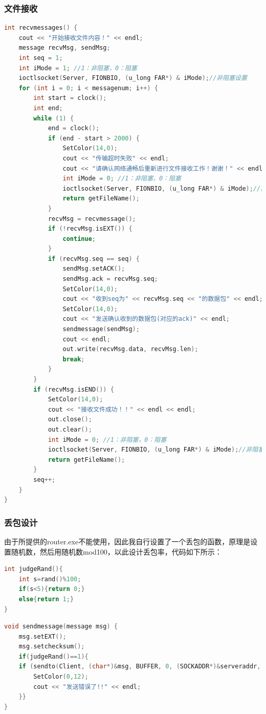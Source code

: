 \documentclass[UTF8,a4paper,10pt]{ctexart}
\begin{document}
\subsubsection{文件接收}
\begin{lstlisting}[title=服务器接收文件,frame=trbl,language={C++}]
int recvmessages() {
    cout << "开始接收文件内容！" << endl;
    message recvMsg, sendMsg;
    int seq = 1;
    int iMode = 1; //1：非阻塞，0：阻塞
    ioctlsocket(Server, FIONBIO, (u_long FAR*) & iMode);//非阻塞设置
    for (int i = 0; i < messagenum; i++) {
        int start = clock();
        int end;
        while (1) {
            end = clock();
            if (end - start > 2000) {
                SetColor(14,0);
                cout << "传输超时失败" << endl;
                cout << "请确认网络通畅后重新进行文件接收工作！谢谢！" << endl;
                int iMode = 0; //1：非阻塞，0：阻塞
                ioctlsocket(Server, FIONBIO, (u_long FAR*) & iMode);//非阻塞设置
                return getFileName();
            }
            recvMsg = recvmessage();
            if (!recvMsg.isEXT()) {
                continue;
            }
            if (recvMsg.seq == seq) {
                sendMsg.setACK();
                sendMsg.ack = recvMsg.seq;
                SetColor(14,0);
                cout << "收到seq为" << recvMsg.seq << "的数据包" << endl;
                SetColor(14,0);
                cout << "发送确认收到的数据包(对应的ack)" << endl;
                sendmessage(sendMsg);
                cout << endl;
                out.write(recvMsg.data, recvMsg.len);
                break;
            }
        }
        if (recvMsg.isEND()) {
            SetColor(14,0);
            cout << "接收文件成功！！" << endl << endl;
            out.close();
            out.clear();
            int iMode = 0; //1：非阻塞，0：阻塞
            ioctlsocket(Server, FIONBIO, (u_long FAR*) & iMode);//非阻塞设置
            return getFileName();
        }
        seq++;
    }
}
\end{lstlisting}
\subsubsection{丢包设计}
由于所提供的router.exe不能使用，因此我自行设置了一个丢包的函数，原理是设置随机数，然后用随机数mod100，以此设计丢包率，代码如下所示：
\begin{lstlisting}[title=丢包函数,frame=trbl,language={C++}]
int judgeRand(){
    int s=rand()%100;
    if(s<5){return 0;}
    else{return 1;}
}
\end{lstlisting}
\begin{lstlisting}[title=发送函数,frame=trbl,language={C++}]
void sendmessage(message msg) {
    msg.setEXT();
    msg.setchecksum();
    if(judgeRand()==1){
    if (sendto(Client, (char*)&msg, BUFFER, 0, (SOCKADDR*)&serveraddr, sizeof(SOCKADDR)) == (SOCKET_ERROR)) {
        SetColor(0,12);
        cout << "发送错误了!!" << endl;
    }}
}
\end{lstlisting}
\end{document}
